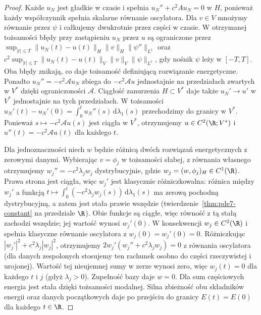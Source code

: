 \begin{proof}
Każde $u_N$ jest gładkie w czasie i spełnia
$u_N''+c^2Au_N=0$ w $H$, ponieważ każdy współczynnik
spełnia skalarne równanie oscylatora.
Dla $v\in V$ mnożymy równanie przez $\psi$ i całkujemy
dwukrotnie przez części w czasie. W otrzymanej tożsamości
błędy przy zastąpieniu $u_N$ przez $u$ są ograniczone
przez
$\sup_{|t|\le T}\|u_N(t)-u(t)\|_H\|v\|_H\|\psi''\|_{L^1}$
oraz
$c^2\sup_{|t|\le T}\|u_N(t)-u(t)\|_V\|v\|_V\|\psi\|_{L^1}$,
gdy nośnik $\psi$ leży w $[-T,T]$.
Oba błędy znikają, co daje tożsamość definiującą
rozwiązanie energetyczne.
Ponadto $u_N''=-c^2\mathcal Au_N$ zbiega do
$-c^2\mathcal Au$ jednostajnie na przedziałach zwartych
w $V^*$ dzięki ograniczoności $\mathcal A$.
Ciągłość zanurzenia $H\subset V^*$ daje także
$u_N'\to u'$ w $V^*$ jednostajnie na tych przedziałach.
W tożsamości
$u_N'(t)-u_N'(0)=\int_0^t u_N''(s)\,\mathrm d\lambda_1(s)$
przechodzimy do granicy w $V^*$. Ponieważ
$s\mapsto-c^2\mathcal Au(s)$ jest ciągła w $V^*$,
otrzymujemy $u\in C^2(\R;V^*)$ i
$u''(t)=-c^2\mathcal Au(t)$ dla każdego $t$.

Dla jednoznaczności niech $w$ będzie różnicą dwóch
rozwiązań energetycznych z zerowymi danymi. Wybierając
$v=\phi_j$ w tożsamości słabej, z równania własnego
otrzymujemy $w_j''=-c^2\lambda_j w_j$ dystrybucyjnie,
gdzie $w_j=(w,\phi_j)_H\in C^1(\R)$.
Prawa strona jest ciągła, więc $w_j'$ jest klasycznie
różniczkowalna: różnica między $w_j'$ a funkcją
$t\mapsto\int_0^t(-c^2\lambda_jw_j(s))\,\mathrm d\lambda_1(s)$
ma zerową pochodną dystrybucyjną, a zatem jest stała
prawie wszędzie (twierdzenie~\ref{thm:pde7-constant}
na przedziale $\R$). Obie funkcje są ciągłe, więc równość
z tą stałą zachodzi wszędzie; jej wartość wynosi $w_j'(0)$.
W konsekwencji $w_j\in C^2(\R)$ i spełnia klasyczne
równanie oscylatora z $w_j(0)=w_j'(0)=0$.
Różniczkując $|w_j'|^2+c^2\lambda_j|w_j|^2$,
otrzymujemy $2w_j'(w_j''+c^2\lambda_jw_j)=0$
z równania oscylatora (dla danych zespolonych stosujemy
ten rachunek osobno do części rzeczywistej i urojonej). Wartość
tej nieujemnej sumy w zerze wynosi zero, więc
$w_j(t)=0$ dla każdego $t$ i $j$ (gdyż $\lambda_j>0$).
Zupełność bazy daje $w=0$.
Dla sum częściowych energia jest stała dzięki tożsamości
modalnej. Silna zbieżność obu składników energii oraz
danych początkowych daje po przejściu do granicy
$E(t)=E(0)$ dla każdego $t\in\R$.
\end{proof}

